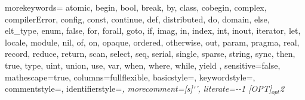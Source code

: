   {
    morekeywords={
      atomic,
      begin, bool, break, by,
      class, cobegin, complex, compilerError, config, const, continue,
      def, distributed, do, domain,
      else, elt_type, enum,
      false, for, forall,
      goto,
      if, imag, in, index, int, inout, iterator,
      let, locale,
      module,
      nil,
      of, on, opaque, ordered, otherwise, out,
      param, pragma,
      real, record, reduce, return,
      scan, select, seq, serial, single, sparse, string, sync,
      then, true, type,
      uint, union, use,
      var,
      when, where, while,
      yield
    },
    sensitive=false,
    mathescape=true,
    columns=fullflexible,
    basicstyle=\small,
    keywordstyle=\footnotesize\ttfamily,
    commentstyle=\footnotesize\ttfamily,
    identifierstyle=\small\itshape,
    morecomment=[s]{`}{'},
    literate={-}{{\ttfamily -}}{1}
             {[OPT]}{{{\scriptsize $_{opt}$}}}{2}
  }


\newcommand{\sntx}[1]{\lstinline[language=syntax]!#1!}
